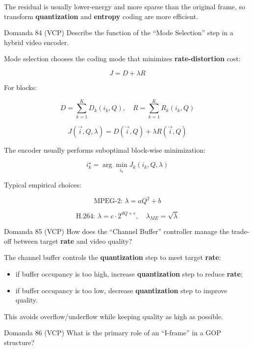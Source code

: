 The residual is usually lower-energy and more sparse than the original frame, so transform \textbf{quantization} and \textbf{entropy} coding are more efficient.



\begin{questionbox}{Domanda 84}
(VCP) Describe the function of the “Mode Selection” step in a hybrid video encoder.
\end{questionbox}


Mode selection chooses the coding mode that minimizes \textbf{\textbf{rate}-\textbf{distortion}} cost:


$$
J = D+\lambda R
$$


For blocks:


$$
D=\sum_{k=1}^{K}D_k(i_k,Q),
\quad
R=\sum_{k=1}^{K}R_k(i_k,Q)
$$



$$
J(\vec{i},Q,\lambda)=D(\vec{i},Q)+\lambda R(\vec{i},Q)
$$


The encoder usually performs suboptimal block-wise minimization:


$$
i_k^\star=\arg\min_{i_k}J_k(i_k,Q,\lambda)
$$


Typical empirical choices:


$$
\text{MPEG-2: } \lambda=aQ^2+b
$$



$$
\text{H.264: } \lambda=c\cdot2^{dQ+e},
\quad
\lambda_{ME}=\sqrt{\lambda}
$$




\begin{questionbox}{Domanda 85}
(VCP) How does the “Channel Buffer” controller manage the trade-off between target \textbf{rate} and video quality?
\end{questionbox}


The channel buffer controls the \textbf{quantization} step to meet target \textbf{rate}:

\begin{itemize}
  \item if buffer occupancy is too high, increase \textbf{quantization} step to reduce \textbf{rate};
  \item if buffer occupancy is too low, decrease \textbf{quantization} step to improve quality.
\end{itemize}

This avoids overflow/underflow while keeping quality as high as possible.



\begin{questionbox}{Domanda 86}
(VCP) What is the primary role of an “I-frame” in a GOP structure?
\end{questionbox}


